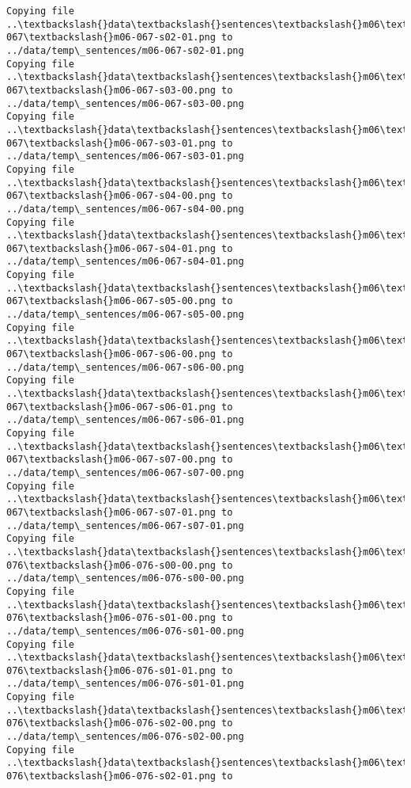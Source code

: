 \documentclass[11pt]{article}
\begin{document}
\begin{Verbatim}[commandchars=\\\{\}]
Copying file ..\textbackslash{}data\textbackslash{}sentences\textbackslash{}m06\textbackslash{}m06-067\textbackslash{}m06-067-s02-01.png to
../data/temp\_sentences/m06-067-s02-01.png
Copying file ..\textbackslash{}data\textbackslash{}sentences\textbackslash{}m06\textbackslash{}m06-067\textbackslash{}m06-067-s03-00.png to
../data/temp\_sentences/m06-067-s03-00.png
Copying file ..\textbackslash{}data\textbackslash{}sentences\textbackslash{}m06\textbackslash{}m06-067\textbackslash{}m06-067-s03-01.png to
../data/temp\_sentences/m06-067-s03-01.png
Copying file ..\textbackslash{}data\textbackslash{}sentences\textbackslash{}m06\textbackslash{}m06-067\textbackslash{}m06-067-s04-00.png to
../data/temp\_sentences/m06-067-s04-00.png
Copying file ..\textbackslash{}data\textbackslash{}sentences\textbackslash{}m06\textbackslash{}m06-067\textbackslash{}m06-067-s04-01.png to
../data/temp\_sentences/m06-067-s04-01.png
Copying file ..\textbackslash{}data\textbackslash{}sentences\textbackslash{}m06\textbackslash{}m06-067\textbackslash{}m06-067-s05-00.png to
../data/temp\_sentences/m06-067-s05-00.png
Copying file ..\textbackslash{}data\textbackslash{}sentences\textbackslash{}m06\textbackslash{}m06-067\textbackslash{}m06-067-s06-00.png to
../data/temp\_sentences/m06-067-s06-00.png
Copying file ..\textbackslash{}data\textbackslash{}sentences\textbackslash{}m06\textbackslash{}m06-067\textbackslash{}m06-067-s06-01.png to
../data/temp\_sentences/m06-067-s06-01.png
Copying file ..\textbackslash{}data\textbackslash{}sentences\textbackslash{}m06\textbackslash{}m06-067\textbackslash{}m06-067-s07-00.png to
../data/temp\_sentences/m06-067-s07-00.png
Copying file ..\textbackslash{}data\textbackslash{}sentences\textbackslash{}m06\textbackslash{}m06-067\textbackslash{}m06-067-s07-01.png to
../data/temp\_sentences/m06-067-s07-01.png
Copying file ..\textbackslash{}data\textbackslash{}sentences\textbackslash{}m06\textbackslash{}m06-076\textbackslash{}m06-076-s00-00.png to
../data/temp\_sentences/m06-076-s00-00.png
Copying file ..\textbackslash{}data\textbackslash{}sentences\textbackslash{}m06\textbackslash{}m06-076\textbackslash{}m06-076-s01-00.png to
../data/temp\_sentences/m06-076-s01-00.png
Copying file ..\textbackslash{}data\textbackslash{}sentences\textbackslash{}m06\textbackslash{}m06-076\textbackslash{}m06-076-s01-01.png to
../data/temp\_sentences/m06-076-s01-01.png
Copying file ..\textbackslash{}data\textbackslash{}sentences\textbackslash{}m06\textbackslash{}m06-076\textbackslash{}m06-076-s02-00.png to
../data/temp\_sentences/m06-076-s02-00.png
Copying file ..\textbackslash{}data\textbackslash{}sentences\textbackslash{}m06\textbackslash{}m06-076\textbackslash{}m06-076-s02-01.png to

\end{Verbatim}
\end{document}
